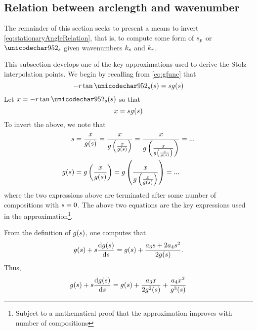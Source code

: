 \subsection{Relation between arclength and wavenumber}
The remainder of this section seeks to present a means to invert \eqref{eq:stationaryAngleRelation}, that is, to compute some form of $s_p$ or $\thetas$ given wavenumbers $k_{s}$ and $k_r$.
\par
This subsection develops one of the key approximations used to derive the Stolz interpolation points. We begin by recalling from \eqref{eq:gfunc} that 
\begin{equation}
 -\targetrange\tan\thetas(\parm) = \parm\gfunc(\parm)
\end{equation}
Let $\xang=-\targetrange\tan\thetas(\parm)$ so that
\begin{equation}
 x = sg(s)
\end{equation}
To invert the above, we note that
\begin{equation}
\begin{split}
 \parm &= \frac{\xang}{\gfunc(\parm)} = \frac{\xang}{\gfunc\left(\frac{\xang}{\gfunc(\parm)}\right)} = \frac{\xang}{\gfunc\left(\frac{\xang}{\gfunc\left(\frac{\xang}{\gfunc(\parm)}\right)}\right)} = ...\\
 \gfunc(\parm) &= \gfunc\left(\frac{\xang}{\gfunc(\parm)}\right) = \gfunc\left(\frac{\xang}{\gfunc\left(\frac{\xang}{\gfunc(\parm)}\right)}\right) = ...
\end{split}
\label{eq:Sdefinition}
\end{equation}
where the two expressions above are terminated after some number of compositions with $s=0$. The above two equations are the key expressions used in the approximation\footnote{Subject to a mathematical proof that the approximation improves with number of compositions}. 
\par
From the definition of $g(s)$, one computes that
\begin{equation}
 \gfunc(\parm) + \parm\frac{\d\gfunc(\parm)}{\d\parm}    = \gfunc(\parm) + \frac{\rcoeff_3\parm + 2\rcoeff_4\parm^2}{2\gfunc(\parm)}.%
\end{equation}
Thus,
\begin{equation}
\begin{split}
\gfunc(\parm) + \parm\frac{\d\gfunc(\parm)}{\d\parm} = \gfunc(\parm) + \frac{\rcoeff_3\xang}{2\gfunc^2(\parm)} + \frac{\rcoeff_4\xang^2}{\gfunc^3(\parm)}\\ %
\end{split}
\end{equation}
